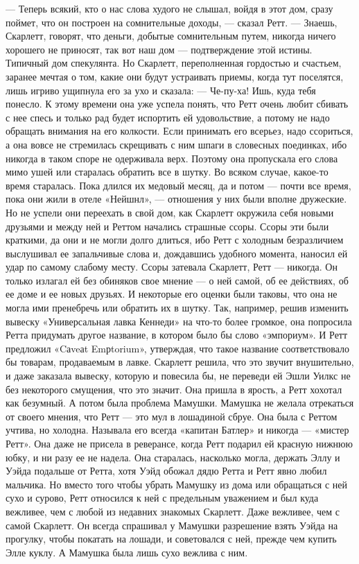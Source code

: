 — Теперь всякий, кто о нас слова худого не слышал, войдя в этот дом, сразу поймет, что он построен на сомнительные доходы, — сказал Ретт. — Знаешь, Скарлетт, говорят, что деньги, добытые сомнительным путем, никогда ничего хорошего не приносят, так вот наш дом — подтверждение этой истины. Типичный дом спекулянта.
Но Скарлетт, переполненная гордостью и счастьем, заранее мечтая о том, какие они будут устраивать приемы, когда тут поселятся, лишь игриво ущипнула его за ухо и сказала:
— Че-пу-ха! Ишь, куда тебя понесло.
К этому времени она уже успела понять, что Ретт очень любит сбивать с нее спесь и только рад будет испортить ей удовольствие, а потому не надо обращать внимания на его колкости. Если принимать его всерьез, надо ссориться, а она вовсе не стремилась скрещивать с ним шпаги в словесных поединках, ибо никогда в таком споре не одерживала верх. Поэтому она пропускала его слова мимо ушей или старалась обратить все в шутку. Во всяком случае, какое-то время старалась.
Пока длился их медовый месяц, да и потом — почти все время, пока они жили в отеле «Нейшнл», — отношения у них были вполне дружеские. Но не успели они переехать в свой дом, как Скарлетт окружила себя новыми друзьями и между ней и Реттом начались страшные ссоры. Ссоры эти были краткими, да они и не могли долго длиться, ибо Ретт с холодным безразличием выслушивал ее запальчивые слова и, дождавшись удобного момента, наносил ей удар по самому слабому месту. Ссоры затевала Скарлетт, Ретт — никогда. Он только излагал ей без обиняков свое мнение — о ней самой, об ее действиях, об ее доме и ее новых друзьях. И некоторые его оценки были таковы, что она не могла ими пренебречь или обратить их в шутку.
Так, например, решив изменить вывеску «Универсальная лавка Кеннеди» на что-то более громкое, она попросила Ретта придумать другое название, в котором было бы слово «эмпориум». И Ретт предложил «Cаveаt Emрtorium», утверждая, что такое название соответствовало бы товарам, продаваемым в лавке. Скарлетт решила, что это звучит внушительно, и даже заказала вывеску, которую и повесила бы, не переведи ей Эшли Уилкс не без некоторого смущения, что это значит. Она пришла в ярость, а Ретт хохотал как безумный.
А потом была проблема Мамушки. Мамушка не желала отрекаться от своего мнения, что Ретт — это мул в лошадиной сбруе. Она была с Реттом учтива, но холодна. Называла его всегда «капитан Батлер» и никогда — «мистер Ретт». Она даже не присела в реверансе, когда Ретт подарил ей красную нижнюю юбку, и ни разу ее не надела. Она старалась, насколько могла, держать Эллу и Уэйда подальше от Ретта, хотя Уэйд обожал дядю Ретта и Ретт явно любил мальчика. Но вместо того чтобы убрать Мамушку из дома или обращаться с ней сухо и сурово, Ретт относился к ней с предельным уважением и был куда вежливее, чем с любой из недавних знакомых Скарлетт. Даже вежливее, чем с самой Скарлетт. Он всегда спрашивал у Мамушки разрешение взять Уэйда на прогулку, чтобы покатать на лошади, и советовался с ней, прежде чем купить Элле куклу. А Мамушка была лишь сухо вежлива с ним.
